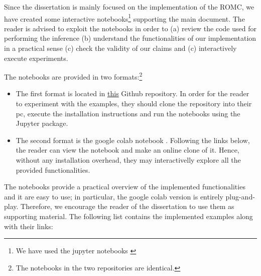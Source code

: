 Since the dissertation is mainly focused on the implementation of the
ROMC, we have created some interactive notebooks\footnote{We have used
  the jupyter notebooks \autocite{Kluyver:2016aa}} supporting the main
document. The reader is advised to exploit the notebooks in order to
(a) review the code used for performing the inference (b) understand
the functionalities of our implementation in a practical sense (c)
check the validity of our claims and (c) interactively execute
experiments.

The notebooks are provided in two formats:\footnote{The
  notebooks in the two repositories are identical.}

\begin{itemize}
\item The first format is located in
  \href{https://github.com/givasile/edinburgh-thesis/tree/master/notebook_examples}{this}
  Github repository. In order for the reader to experiment with the
  examples, they should clone the repository into their pc, execute
  the installation instructions and run the notebooks using the
  Jupyter package.
\item The second format is the google colab notebook
  \autocite{Bisong2019}. Following the links below, the reader can
  view the notebook and make an online clone of it. Hence, without any
  installation overhead, they may interactivelly explore all the
  provided functionalities.
\end{itemize}


The notebooks provide a practical overview of the implemented
functionalities and it are easy to use; in particular, the google
colab version is entirely plug-and-play. Therefore, we encourage the
reader of the dissertation to use them as supporting material.  The
following list contains the implemented examples along with their
links:

